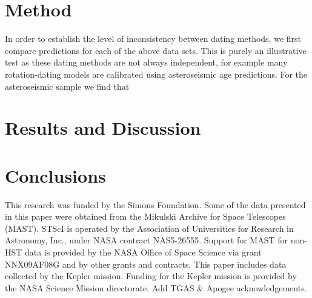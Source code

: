 \documentclass[useAMS, usenatbib, preprint, 12pt]{aastex}
\newcommand{\racomment}[1]{{\color{red}#1}}
\begin{document}
\section{Method}
\label{sec:method}

In order to establish the level of inconsistency between dating methods, we
first compare predictions for each of the above data sets.
This is purely an illustrative test as these dating methods are not always
independent, for example many rotation-dating models are calibrated using
asteroseismic age predictions.
For the asteroseismic sample we find that

\section{Results and Discussion}
\label{sec:results}

\section{Conclusions}

This research was funded by the Simons Foundation.
Some of the data presented in this paper were obtained from the Mikulski
Archive for Space Telescopes (MAST).
STScI is operated by the Association of Universities for Research in
Astronomy, Inc., under NASA contract NAS5-26555.
Support for MAST for non-HST data is provided by the NASA Office of Space
Science via grant NNX09AF08G and by other grants and contracts.
This paper includes data collected by the Kepler mission. Funding for the
Kepler mission is provided by the NASA Science Mission directorate.
\racomment{Add TGAS \& Apogee acknowledgements.}



\end{document}
